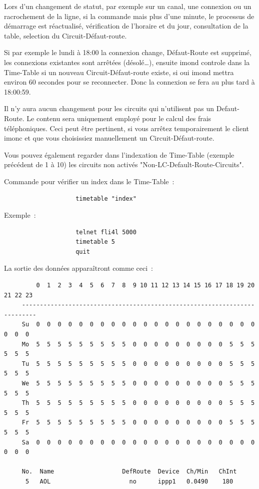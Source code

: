   Lors d'un changement de statut, par exemple sur un canal, une connexion
  ou un racrochement de la ligne, si la commande mais plus d'une minute,
  le processus de démarrage est réactualisé, vérification de l'horaire et
  du jour, consultation de la table, selection du Circuit-Défaut-route.

  Si par exemple le lundi à 18:00 la connexion change, Défaut-Route est
  supprimé, les connexions existantes sont arrêtées (désolé\ldots),
  ensuite imond controle dans la Time-Table si un nouveau Circuit-Défaut-route
  existe, si oui imond mettra environ 60 secondes pour se reconnecter.
  Donc la connexion se fera au plus tard à 18:00:59.

  Il n'y aura aucun changement pour les circuits qui n'utilisent pas
  un Defaut-Route. Le contenu  sera
  uniquement employé pour le calcul des frais téléphoniques. Ceci peut
  être pertinent, si vous arrêtez temporairement le client imonc et que
  vous choisissiez manuellement un Circuit-Défaut-route.

  Vous pouvez également regarder dans l'indexation de Time-Table (exemple
  précédent de 1 à 10) les circuits non activés "Non-LC-Default-Route-Circuits".

  Commande pour vérifier un index dans le Time-Table~:

\begin{example}
\begin{verbatim}
                    timetable "index"
\end{verbatim}
\end{example}

  Exemple~:

\begin{example}
\begin{verbatim}
                    telnet fli4l 5000
                    timetable 5
                    quit
\end{verbatim}
\end{example}

  La sortie des données apparaîtront comme ceci~:

\begin{example}
\begin{verbatim}
         0  1  2  3  4  5  6  7  8  9 10 11 12 13 14 15 16 17 18 19 20 21 22 23
     --------------------------------------------------------------------------
     Su  0  0  0  0  0  0  0  0  0  0  0  0  0  0  0  0  0  0  0  0  0  0  0  0
     Mo  5  5  5  5  5  5  5  5  5  0  0  0  0  0  0  0  0  0  5  5  5  5  5  5
     Tu  5  5  5  5  5  5  5  5  5  0  0  0  0  0  0  0  0  0  5  5  5  5  5  5
     We  5  5  5  5  5  5  5  5  5  0  0  0  0  0  0  0  0  0  5  5  5  5  5  5
     Th  5  5  5  5  5  5  5  5  5  0  0  0  0  0  0  0  0  0  5  5  5  5  5  5
     Fr  5  5  5  5  5  5  5  5  5  0  0  0  0  0  0  0  0  0  5  5  5  5  5  5
     Sa  0  0  0  0  0  0  0  0  0  0  0  0  0  0  0  0  0  0  0  0  0  0  0  0

     No.  Name                   DefRoute  Device  Ch/Min   ChInt
      5   AOL                      no      ippp1   0.0490    180
\end{verbatim}
\end{example}

